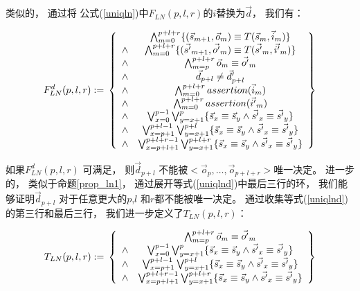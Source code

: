 类似的，
通过将 公式(\ref{uniqln})中$F_{LN}(p,l,r)$的$i$替换为$\vec{d}$，
我们有：

\begin{equation}\label{uniqlnd}
F^d_{LN}(p,l,r):=\\
\left\{
\begin{array}{cc}
&\bigwedge_{m=0}^{p+l+r}
\{
(\vec{s}_{m+1},\vec{o}_m)\equiv T(\vec{s}_m,\vec{i}_m)
\}
\\
\wedge&\bigwedge_{m=0}^{p+l+r}
\{
(\vec{s'}_{m+1},\vec{o'}_m)\equiv T(\vec{s'}_m,\vec{i'}_m)
\}
\\
\wedge&\bigwedge_{m=p}^{p+l+r}\vec{o}_m\equiv \vec{o'}_m \\
\wedge& \vec{d}_{p+l}\ne \vec{d}'_{p+l} \\
\wedge&\bigwedge_{m=0}^{p+l+r}assertion(\vec{i}_m) \\
\wedge&\bigwedge_{m=0}^{p+l+r}assertion(\vec{i'}_m) \\
\wedge&\bigvee_{x=0}^{p-1}\bigvee_{y=x+1}^{p} \{\vec{s}_x\equiv \vec{s}_y\wedge \vec{s'}_x\equiv \vec{s'}_y\} \\
\wedge&\bigvee_{x=p+1}^{p+l-1}\bigvee_{y=x+1}^{p+l} \{\vec{s}_x\equiv \vec{s}_y\wedge \vec{s'}_x\equiv \vec{s'}_y\} \\
\wedge&\bigvee_{x=p+l+1}^{p+l+r-1}\bigvee_{y=x+1}^{p+l+r} \{\vec{s}_x\equiv \vec{s}_y\wedge \vec{s'}_x\equiv \vec{s'}_y\}
\end{array}
\right\}
\end{equation}

如果$F^d_{LN}(p,l,r)$ 可满足，
则$\vec{d}_{p+l}$ 不能被$<\vec{o}_p,\dots,\vec{o}_{p+l+r}>$唯一决定。
进一步的，
类似于命题\ref{prop_ln1}，
通过展开等式(\ref{uniqlnd})中最后三行的环，
我们能够证明$\vec{d}_{p+l}$ 对于任意更大的$p$,$l$ 和$r$都不能被唯一决定。
通过收集等式(\ref{uniqlnd})的第三行和最后三行，
我们进一步定义了$T_{LN}(p,l,r)$：

\begin{equation}\label{tln}
T_{LN}(p,l,r):=\\
\left\{
\begin{array}{cc}
      &\bigwedge_{m=p}^{p+l+r}\vec{o}_m\equiv \vec{o'}_m \\
\wedge&\bigvee_{x=0}^{p-1}\bigvee_{y=x+1}^{p} \{\vec{s}_x\equiv \vec{s}_y\wedge \vec{s'}_x\equiv \vec{s'}_y\} \\
\wedge&\bigvee_{x=p+1}^{p+l-1}\bigvee_{y=x+1}^{p+l} \{\vec{s}_x\equiv \vec{s}_y\wedge \vec{s'}_x\equiv \vec{s'}_y\} \\
\wedge&\bigvee_{x=p+l+1}^{p+l+r-1}\bigvee_{y=x+1}^{p+l+r} \{\vec{s}_x\equiv \vec{s}_y\wedge \vec{s'}_x\equiv \vec{s'}_y\}
\end{array}
\right\}
\end{equation}

